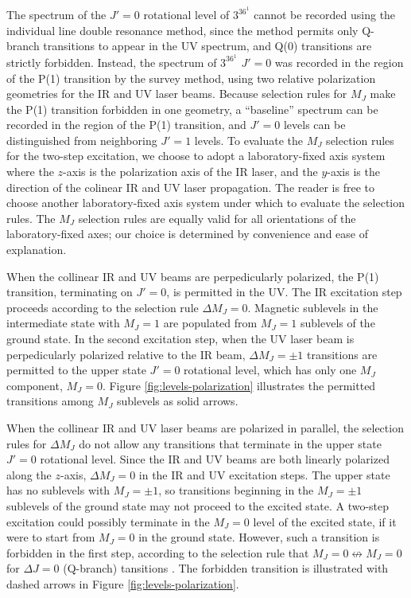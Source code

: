 \documentclass[12pt]{mitthesis}
\begin{document}
The spectrum of the $J'=0$ rotational level of $3^36^1$  cannot
be recorded using the individual line double resonance method, since
the method permits only Q-branch transitions to appear in the UV
spectrum, and Q(0) transitions are strictly forbidden.  Instead, the
spectrum of $3^36^1$  $J'=0$ was recorded in the region of the
P(1) transition by the survey method, using two relative polarization
geometries for the IR and UV laser beams.  Because selection rules for
$M_J$ make the P(1) transition forbidden in one geometry, a
``baseline'' spectrum can be recorded in the region of the P(1)
transition, and $J'=0$ levels can be distinguished from neighboring
$J'=1$ levels.  To evaluate the $M_J$ selection rules for the two-step
excitation, we choose to adopt a laboratory-fixed axis system where
the $z$-axis is the polarization axis of the IR laser, and the
$y$-axis is the direction of the colinear IR and UV laser propagation.
The reader is free to choose another laboratory-fixed axis system
under which to evaluate the selection rules.  The $M_J$ selection
rules are equally valid for all orientations of the laboratory-fixed
axes; our choice is determined by convenience and ease of explanation.

When the collinear IR and UV beams are perpedicularly polarized, the
P(1) transition, terminating on $J'=0$, is permitted in the UV.  The
IR excitation step proceeds according to the selection rule $\Delta
M_J=0$.  Magnetic sublevels in the intermediate state with $M_J=1$ are
populated from $M_J=1$ sublevels of the ground state.  In the second
excitation step, when the UV laser beam is perpedicularly polarized
relative to the IR beam, $\Delta M_J = \pm 1$ transitions are
permitted to the upper state $J'=0$ rotational level, which has only
one $M_J$ component, $M_J=0$.  Figure \ref{fig:levels-polarization}
illustrates the permitted transitions among $M_J$ sublevels as solid
arrows.

When the collinear IR and UV laser beams are polarized in parallel,
the selection rules for $\Delta M_J$ do not allow any transitions that
terminate in the upper state $J'=0$ rotational level.  Since the IR
and UV beams are both linearly polarized along the $z$-axis, $\Delta
M_J = 0$ in the IR and UV excitation steps.  The upper state has no
sublevels with $M_J=\pm 1$, so transitions beginning in the $M_J=\pm
1$ sublevels of the ground state may not proceed to the excited state.
A two-step excitation could possibly terminate in the $M_J=0$ level of
the excited state, if it were to start from $M_J=0$ in the ground
state.  However, such a transition is forbidden in the first step,
according to the selection rule that $M_J=0 \nleftrightarrow M_J=0$
for $\Delta J = 0$ (Q-branch) tansitions \cite{herzberg66}.  The
forbidden transition is illustrated with dashed arrows in Figure
\ref{fig:levels-polarization}.
\end{document}
